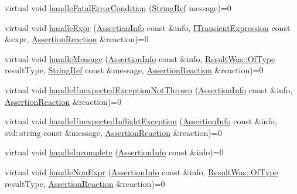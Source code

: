 \begin{DoxyCompactItemize}
\item 
virtual void \mbox{\hyperlink{struct_catch_1_1_i_result_capture_a48559e6598ba9474b903697b69c769b2}{handle\+Fatal\+Error\+Condition}} (\mbox{\hyperlink{class_catch_1_1_string_ref}{String\+Ref}} message)=0
\item 
virtual void \mbox{\hyperlink{struct_catch_1_1_i_result_capture_a59a2b05391e464954575d2afb6d5d607}{handle\+Expr}} (\mbox{\hyperlink{struct_catch_1_1_assertion_info}{Assertion\+Info}} const \&info, \mbox{\hyperlink{struct_catch_1_1_i_transient_expression}{I\+Transient\+Expression}} const \&expr, \mbox{\hyperlink{struct_catch_1_1_assertion_reaction}{Assertion\+Reaction}} \&reaction)=0
\item 
virtual void \mbox{\hyperlink{struct_catch_1_1_i_result_capture_a21788ebc64571abf322b80c8cc51794d}{handle\+Message}} (\mbox{\hyperlink{struct_catch_1_1_assertion_info}{Assertion\+Info}} const \&info, \mbox{\hyperlink{struct_catch_1_1_result_was_a624e1ee3661fcf6094ceef1f654601ef}{Result\+Was\+::\+Of\+Type}} result\+Type, \mbox{\hyperlink{class_catch_1_1_string_ref}{String\+Ref}} const \&message, \mbox{\hyperlink{struct_catch_1_1_assertion_reaction}{Assertion\+Reaction}} \&reaction)=0
\item 
virtual void \mbox{\hyperlink{struct_catch_1_1_i_result_capture_a6382ed20486e2d9a020da971c6d5c53d}{handle\+Unexpected\+Exception\+Not\+Thrown}} (\mbox{\hyperlink{struct_catch_1_1_assertion_info}{Assertion\+Info}} const \&info, \mbox{\hyperlink{struct_catch_1_1_assertion_reaction}{Assertion\+Reaction}} \&reaction)=0
\item 
virtual void \mbox{\hyperlink{struct_catch_1_1_i_result_capture_afc97bc69829185222f955ebeef97adfe}{handle\+Unexpected\+Inflight\+Exception}} (\mbox{\hyperlink{struct_catch_1_1_assertion_info}{Assertion\+Info}} const \&info, std\+::string const \&message, \mbox{\hyperlink{struct_catch_1_1_assertion_reaction}{Assertion\+Reaction}} \&reaction)=0
\item 
virtual void \mbox{\hyperlink{struct_catch_1_1_i_result_capture_a89b89372eb09cc44f8dcad363de6157d}{handle\+Incomplete}} (\mbox{\hyperlink{struct_catch_1_1_assertion_info}{Assertion\+Info}} const \&info)=0
\item 
virtual void \mbox{\hyperlink{struct_catch_1_1_i_result_capture_ab7dbdf8aa28427119583e24dbb302c63}{handle\+Non\+Expr}} (\mbox{\hyperlink{struct_catch_1_1_assertion_info}{Assertion\+Info}} const \&info, \mbox{\hyperlink{struct_catch_1_1_result_was_a624e1ee3661fcf6094ceef1f654601ef}{Result\+Was\+::\+Of\+Type}} result\+Type, \mbox{\hyperlink{struct_catch_1_1_assertion_reaction}{Assertion\+Reaction}} \&reaction)=0

\end{DoxyCompactItemize}
